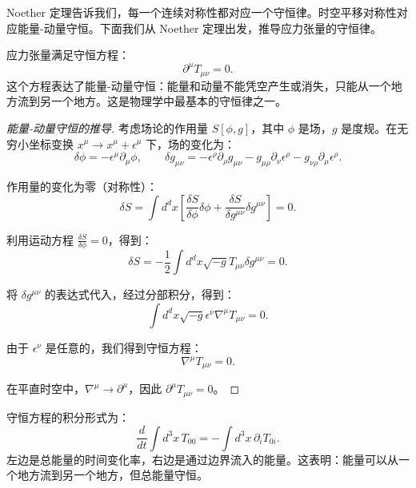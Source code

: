 Noether 定理告诉我们，每一个连续对称性都对应一个守恒律。时空平移对称性对应能量-动量守恒。下面我们从 Noether 定理出发，推导应力张量的守恒律。

\begin{theorem}[能量-动量守恒]
应力张量满足守恒方程：
\begin{equation}
    \partial^\mu T_{\mu\nu} = 0.
\end{equation}
这个方程表达了能量-动量守恒：能量和动量不能凭空产生或消失，只能从一个地方流到另一个地方。这是物理学中最基本的守恒律之一。
\end{theorem}

\begin{proof}[能量-动量守恒的推导]
考虑场论的作用量 $S[\phi, g]$，其中 $\phi$ 是场，$g$ 是度规。在无穷小坐标变换 $x^\mu \to x^\mu + \epsilon^\mu$ 下，场的变化为：
\begin{equation}
    \delta \phi = -\epsilon^\mu \partial_\mu \phi, \qquad \delta g_{\mu\nu} = -\epsilon^\rho \partial_\rho g_{\mu\nu} - g_{\mu\rho} \partial_\nu \epsilon^\rho - g_{\nu\rho} \partial_\mu \epsilon^\rho.
\end{equation}

作用量的变化为零（对称性）：
\begin{equation}
    \delta S = \int d^d x \left[\frac{\delta S}{\delta \phi} \delta \phi + \frac{\delta S}{\delta g^{\mu\nu}} \delta g^{\mu\nu}\right] = 0.
\end{equation}

利用运动方程 $\frac{\delta S}{\delta \phi} = 0$，得到：
\begin{equation}
    \delta S = -\frac{1}{2} \int d^d x \sqrt{-g} T_{\mu\nu} \delta g^{\mu\nu} = 0.
\end{equation}

将 $\delta g^{\mu\nu}$ 的表达式代入，经过分部积分，得到：
\begin{equation}
    \int d^d x \sqrt{-g} \epsilon^\nu \nabla^\mu T_{\mu\nu} = 0.
\end{equation}

由于 $\epsilon^\nu$ 是任意的，我们得到守恒方程：
\begin{equation}
    \nabla^\mu T_{\mu\nu} = 0.
\end{equation}

在平直时空中，$\nabla^\mu \to \partial^\mu$，因此 $\partial^\mu T_{\mu\nu} = 0$。
\end{proof}

\begin{note}[守恒律的物理意义]
守恒方程的积分形式为：
\begin{equation}
    \frac{d}{dt} \int d^3x \, T_{00} = -\int d^3x \, \partial_i T_{0i}.
\end{equation}
左边是总能量的时间变化率，右边是通过边界流入的能量。这表明：能量可以从一个地方流到另一个地方，但总能量守恒。
\end{note}

